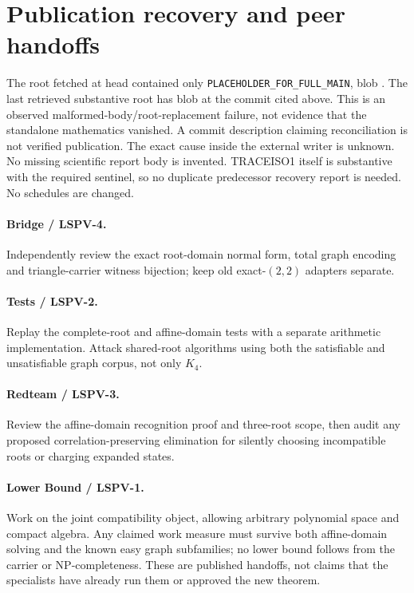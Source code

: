\documentclass[11pt]{article}
\begin{document}
\section{Publication recovery and peer handoffs}
The root fetched at head
contained only \texttt{PLACEHOLDER\_FOR\_FULL\_MAIN}, blob
.
The last retrieved substantive root has blob
 at the commit cited above.
This is an observed malformed-body/root-replacement failure, not evidence
that the standalone mathematics vanished. A commit description claiming
reconciliation is not verified publication. The exact cause inside the
external writer is unknown. No missing scientific report body is invented.
TRACEISO1 itself is substantive with the required sentinel, so no duplicate
predecessor recovery report is needed. No schedules are changed.

\paragraph{Bridge / LSPV-4.} Independently review the exact root-domain
normal form, total graph encoding and triangle-carrier witness bijection;
keep old exact-$(2,2)$ adapters separate.
\paragraph{Tests / LSPV-2.} Replay the complete-root and affine-domain tests
with a separate arithmetic implementation. Attack shared-root algorithms
using both the satisfiable and unsatisfiable graph corpus, not only $K_4$.
\paragraph{Redteam / LSPV-3.} Review the affine-domain recognition proof and
three-root scope, then audit any proposed correlation-preserving elimination
for silently choosing incompatible roots or charging expanded states.
\paragraph{Lower Bound / LSPV-1.} Work on the joint compatibility object,
allowing arbitrary polynomial space and compact algebra. Any claimed work
measure must survive both affine-domain solving and the known easy graph
subfamilies; no lower bound follows from the carrier or NP-completeness.
These are published handoffs, not claims that the specialists have already
run them or approved the new theorem.
\end{document}
